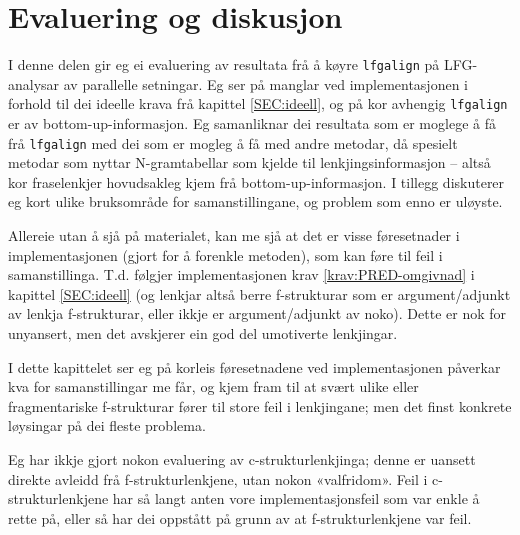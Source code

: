 \documentclass[12pt,a4paper,oneside,draft]{report}
\begin{document}
\chapter{Evaluering og diskusjon}
\label{sec-5}

\label{SEC:diskusjon}


 I denne delen gir eg ei evaluering av resultata frå å køyre
 \texttt{lfgalign} på LFG-analysar av parallelle setningar. Eg ser på manglar
 ved implementasjonen i forhold til dei ideelle krava frå kapittel
 \ref{SEC:ideell}, og på kor avhengig \texttt{lfgalign} er av
 bottom-up-informasjon. Eg samanliknar dei resultata som er moglege å
 få frå \texttt{lfgalign} med dei som er mogleg å få med andre metodar, då
 spesielt metodar som nyttar N-gramtabellar som kjelde til
 lenkjingsinformasjon -- altså kor fraselenkjer hovudsakleg kjem frå
 bottom-up-informasjon. I tillegg diskuterer eg kort ulike bruksområde
 for samanstillingane, og problem som enno er uløyste.

 Allereie utan å sjå på materialet, kan me sjå at det er visse
 føresetnader i implementasjonen (gjort for å forenkle metoden), som
 kan føre til feil i samanstillinga. T.d. følgjer implementasjonen
 krav \ref{krav:PRED-omgivnad} i kapittel \ref{SEC:ideell} (og lenkjar
 altså berre f-strukturar som er argument/adjunkt av lenkja
 f-strukturar, eller ikkje er argument/adjunkt av noko). Dette er nok
 for unyansert, men det avskjerer ein god del umotiverte lenkjingar.

 I dette kapittelet ser eg på korleis føresetnadene ved
 implementasjonen påverkar kva for samanstillingar me får, og kjem
 fram til at svært ulike eller fragmentariske f-strukturar fører til
 store feil i lenkjingane; men det finst konkrete løysingar på dei
 fleste problema. 

 Eg har ikkje gjort nokon evaluering av c-strukturlenkjinga; denne er
 uansett direkte avleidd frå f-strukturlenkjene, utan nokon
 «valfridom». Feil i c-strukturlenkjene har så langt anten vore
 implementasjonsfeil som var enkle å rette på, eller så har dei
 oppstått på grunn av at f-strukturlenkjene var feil.
 
\end{document}
